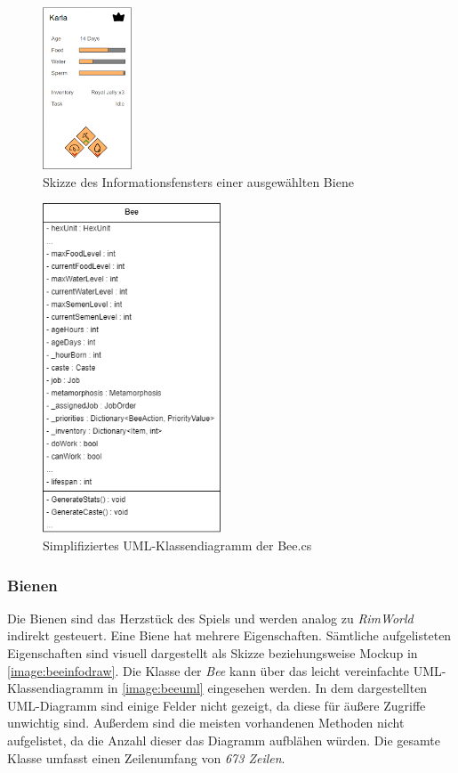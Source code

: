 \begin{figure}
    \begin{center}
        \includegraphics[width=100px]{0.bilder/beeinfodraw.PNG}
    \end{center}
    \caption{Skizze des Informationsfensters einer ausgewählten Biene} \label{image:beeinfodraw}
\end{figure}

\begin{figure}
    \begin{center}
        \includegraphics[width=200px]{0.bilder/beeuml.png}
    \end{center}
    \caption{Simplifiziertes UML-Klassendiagramm der Bee.cs} \label{image:beeuml}
\end{figure}

\subsubsection{Bienen}
Die Bienen sind das Herzstück des Spiels und werden analog zu \textit{RimWorld} indirekt gesteuert. Eine Biene hat mehrere Eigenschaften. Sämtliche aufgelisteten Eigenschaften sind visuell dargestellt als Skizze beziehungsweise Mockup in \autoref{image:beeinfodraw}. Die Klasse der \textit{Bee} kann über das leicht vereinfachte UML-Klassendiagramm in \autoref{image:beeuml} eingesehen werden. In dem dargestellten UML-Diagramm sind einige Felder nicht gezeigt, da diese für äußere Zugriffe unwichtig sind. Außerdem sind die meisten vorhandenen Methoden nicht aufgelistet, da die Anzahl dieser das Diagramm aufblähen würden. Die gesamte Klasse umfasst einen Zeilenumfang von \textit{673 Zeilen}.

